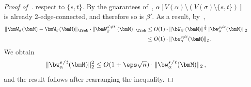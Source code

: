 \begin{proof}[Proof of~]
    respect to $\{s,t\}$. By the guarantees of~,
    $\alpha\left[V(\alpha)\setminus (V(\sigma)\setminus \{s,t\})\right]$ is already
    2-edge-connected, and therefore 
    so is $\beta'$. As a result, by~,
    \begin{align*}
        \|\bmW_\sigma(\bmM) - \bmW_\sigma(\bmH)\|_{\frob} \cdot \|\bmW_\beta^{s'\neq t'}(\bmM)\|_{\frob}&\le O(1)\cdot \|\bW_{\beta'} (\bmM)\|^{\frac 12} \|\bw_\alpha^{s\neq t}(\bmM)\|_2\\
        &\le O(1)\cdot \|\bw_\alpha^{s\neq t}(\bmM)\|_2\,.
    \end{align*}
We obtain
\[
    \|\bw^{s\neq t}_\alpha(\bmM)\|_2^2\le O(1 + \eps \sqrt n)\cdot \|\bw^{s\neq t}_\alpha(\bmM)\|_2\,,
\]
and the result follows after rearranging the inequality.
\end{proof}

